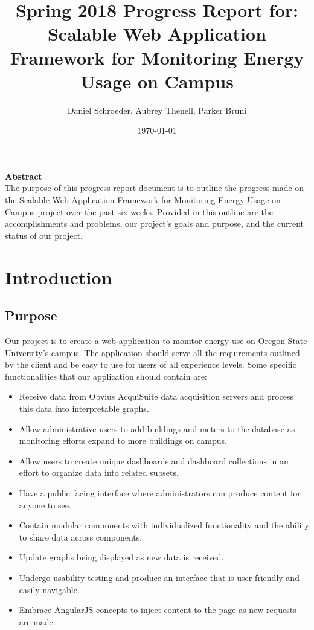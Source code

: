 \documentclass[letterpaper,10pt,serif,draftclsnofoot,onecolumn,compsoc,titlepage]{IEEEtran}
\title{Spring 2018 Progress Report for: \linebreak Scalable Web Application Framework for Monitoring Energy Usage on Campus}
\author{Daniel Schroeder, Aubrey Thenell, Parker Bruni}
\date{\today}
\begin{document}
 \maketitle
 \vspace{2cm}
 \begin{center}
 \noindent \textbf{Abstract} \\
			 \indent The purpose of this progress report document is to outline the progress made on the Scalable Web Application
Framework for Monitoring Energy Usage on Campus project over the past six weeks. Provided in this outline
are the accomplishments and problems, our project's goals and purpose, and the current status of our project.
 \end{center}         
 
 \newpage
\tableofcontents
\newpage

\section{Introduction}
\subsection{Purpose} 
    Our project is to create a web application to monitor energy use on Oregon State University's campus. The application should serve all the requirements outlined by the client and be easy to use for users of all experience levels.
    \noindent Some specific functionalities that our application should contain are:
    \begin{itemize}
        \item Receive data from Obvius AcquiSuite data acquisition servers and process this data into interpretable graphs.
        \item Allow administrative users to add buildings and meters to the database as monitoring efforts expand to more buildings on campus.
        \item Allow users to create unique dashboards and dashboard collections in an effort to organize data into related subsets.
        \item Have a public facing interface where administrators can produce content for anyone to see.
        \item Contain modular components with individualized functionality and the ability to share data across components.
        \item Update graphs being displayed as new data is received.
        \item Undergo usability testing and produce an interface that is user friendly and easily navigable.
        \item Embrace AngularJS concepts to inject content to the page as new requests are made.
    \end{itemize}
\end{document}
